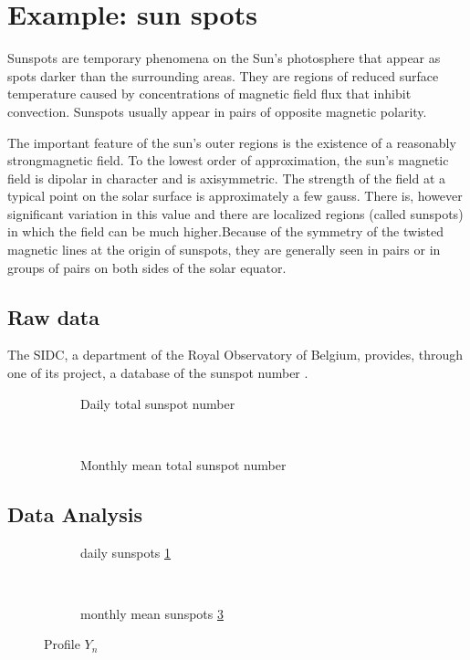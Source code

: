 \section{Example: sun spots}
\graphicspath{{../sunSpots/img/}}
Sunspots are temporary phenomena on the Sun's photosphere that appear as spots darker than the surrounding areas. They are regions of reduced surface temperature caused by concentrations of magnetic field flux that inhibit convection. Sunspots usually appear in pairs of opposite magnetic polarity.

The important feature of the sun’s outer regions is the existence of a reasonably strongmagnetic field. To the lowest order of approximation, the sun’s magnetic field is dipolar in character and is axisymmetric. The strength of the field at a typical point on the solar surface is approximately a few gauss. There is, however significant variation in this value and there are localized regions (called sunspots) in which the field can be much higher.Because of the symmetry of the twisted magnetic lines at the origin of sunspots, they are generally seen in pairs or in groups of pairs on both sides of the solar equator. 

\subsection{Raw data}
The SIDC, a department of the Royal Observatory of Belgium, provides, through one of its project, a database of the sunspot number \cite{sidc}. 


\begin{figure}[htb]
	\centering
	\begin{subfigure}{0.48\textwidth}
		
		\caption{Daily total sunspot number}\label{fig:dailyss}
	\end{subfigure}
	~
	\begin{subfigure}{0.48\textwidth}
		
		\caption{Monthly mean total sunspot number}\label{fig:monthlyss}
	\end{subfigure}
\caption{}
\end{figure}

\subsection{Data Analysis}

\begin{figure}[htb]
	\centering
	\begin{subfigure}{\textwidth}
		
		\caption{}
	\end{subfigure}
	\begin{subfigure}{0.48\textwidth}
		
		\caption{daily sunspots \ref{fig:dailyss}}
	\end{subfigure}
	~
	\begin{subfigure}{0.48\textwidth}
		
		\caption{monthly mean sunspots \ref{fig:monthlyss}}
	\end{subfigure}
	\caption{Profile $Y_n$}
\end{figure}

